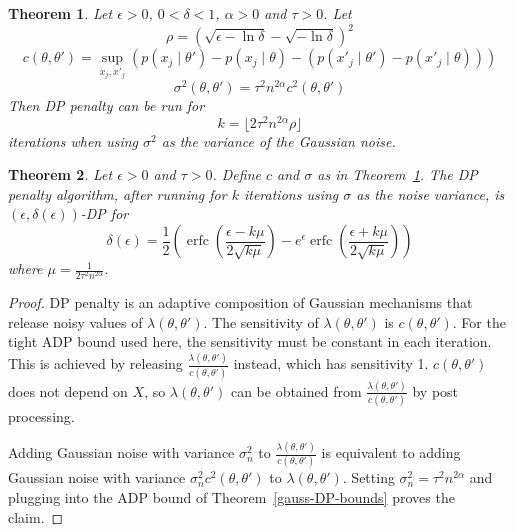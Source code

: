\documentclass[english,twoside,openright]{HYgraduMLDS}
\newtheorem{theorem}{Theorem}
\DeclareMathOperator{\erfc}{erfc}
\begin{document}
\begin{theorem}\label{DP_penalty_theorem_zcdp}
    Let \(\epsilon > 0\), \(0 < \delta < 1\), \(\alpha > 0\) and \(\tau > 0\).
    Let
    \[
        \rho = (\sqrt{\epsilon - \ln \delta} - \sqrt{-\ln \delta})^2
    \]
    \[
        c(\theta, \theta') = \sup_{x_j, x'_j} (p(x_j\mid \theta') - p(x_j\mid \theta) 
        - (p(x'_j\mid \theta') - p(x'_j\mid \theta)))
    \]
    \[
        \sigma^2(\theta, \theta') = \tau^2 n^{2\alpha}c^2(\theta, \theta')
    \]
    Then DP penalty can be run for 
    \[
        k = \lfloor 2\tau^2 n^{2\alpha} \rho\rfloor
    \]
    iterations when using \(\sigma^2\) as the variance of the Gaussian noise.
\end{theorem}

\begin{theorem}\label{DP_penalty_theorem_adp}
    Let \(\epsilon > 0\) and \(\tau > 0\).
    Define \(c\) and \(\sigma\) as in Theorem~\ref{DP_penalty_theorem_zcdp}.
    The DP penalty algorithm, after running for \(k\) iterations using \(\sigma\)
    as the noise variance, 
    is \((\epsilon, \delta(\epsilon))\)-DP for
    \[
        \delta(\epsilon) 
        = \frac{1}{2}\left(
            \erfc\left(\frac{\epsilon - k\mu}{2\sqrt{k\mu}}\right)
            - e^\epsilon \erfc\left(\frac{\epsilon + k\mu}{2\sqrt{k\mu}}\right)
        \right)
    \]
    where \(\mu = \frac{1}{2\tau^2 n^{2\alpha}}\).
\end{theorem}
\begin{proof}
    DP penalty is an adaptive composition of Gaussian mechanisms that release 
    noisy values of \(\lambda(\theta, \theta')\). The sensitivity of 
    \(\lambda(\theta, \theta')\) is 
    \(c(\theta, \theta')\). For the tight ADP bound used here, the sensitivity must be 
    constant in each iteration. This is achieved by releasing 
    \(\frac{\lambda(\theta, \theta')}{c(\theta, \theta')}\) instead, which 
    has sensitivity 1. \(c(\theta, \theta')\) does not depend on \(X\), 
    so \(\lambda(\theta, \theta')\) can be obtained from 
    \(\frac{\lambda(\theta, \theta')}{c(\theta, \theta')}\) by post processing.

    Adding Gaussian noise with variance \(\sigma_n^2\) to 
    \(\frac{\lambda(\theta, \theta')}{c(\theta, \theta')}\)
    is equivalent to adding Gaussian noise with variance 
    \(\sigma_n^2 c^2(\theta, \theta')\) to \(\lambda(\theta, \theta')\).
    Setting \(\sigma_n^2 = \tau^2n^{2\alpha}\) and plugging into 
    the ADP bound of Theorem~\ref{gauss-DP-bounds} proves the 
    claim.
\end{proof}
\end{document}
